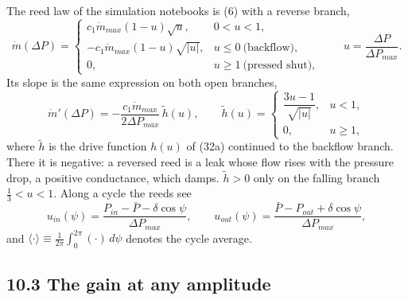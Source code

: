 \documentclass[11pt]{article}
\begin{document}
The reed law of the simulation notebooks is (6) with a reverse branch,
\begin{equation}
\dot m(\Delta P) = \begin{cases} c_1\dot m_{max}(1-u)\sqrt u, & 0 < u < 1, \\[2pt] -c_1\dot m_{max}(1-u)\sqrt{\lvert u\rvert}, & u \le 0 \ \text{(backflow)}, \\[2pt] 0, & u \ge 1 \ \text{(pressed shut)}, \end{cases} \qquad u = \frac{\Delta P}{\Delta P_{max}} . \tag{35}
\end{equation}
Its slope is the same expression on both open branches,
\begin{equation}
\dot m'(\Delta P) = -\frac{c_1\dot m_{max}}{2\Delta P_{max}}\,\tilde h(u), \qquad
\tilde h(u) = \begin{cases} \dfrac{3u-1}{\sqrt{\lvert u\rvert}}, & u < 1, \\[6pt] 0, & u \ge 1 , \end{cases} \tag{36}
\end{equation}
where $\tilde h$ is the drive function $h(u)$ of (32a) continued to the backflow branch. There it is negative: a reversed reed is a leak whose flow rises with the pressure drop, a positive conductance, which damps. $\tilde h > 0$ only on the falling branch $\tfrac13 < u < 1$. Along a cycle the reeds see
\[
u_{in}(\psi) = \frac{P_{in} - \bar P - \delta\cos\psi}{\Delta P_{max}}, \qquad u_{out}(\psi) = \frac{\bar P - P_{out} + \delta\cos\psi}{\Delta P_{max}},
\]
and $\langle\cdot\rangle \equiv \frac{1}{2\pi}\int_0^{2\pi}(\cdot)\,d\psi$ denotes the cycle average.

\subsection*{10.3 The gain at any amplitude}
\end{document}
